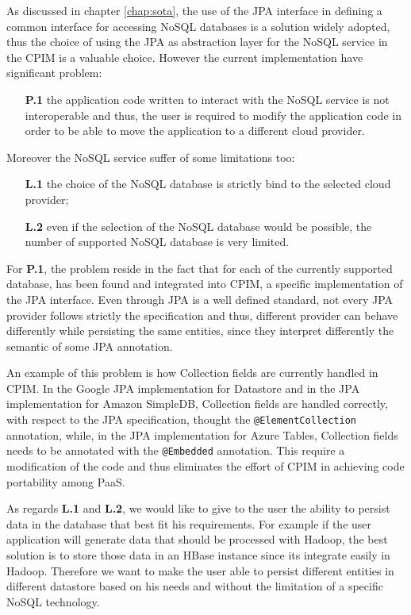 \newparagraph As discussed in chapter \ref{chap:sota}, the use of the JPA interface in defining a common interface for accessing NoSQL databases is a solution widely adopted, thus the choice of using the JPA as abstraction layer for the NoSQL service in the CPIM is a valuable choice. 
However the current implementation have significant problem:
\begin{enumerate}
\item[\textbf{P.1}] the application code written to interact with the NoSQL service is not interoperable and thus, the user is required to modify the application code in order to be able to move the application to a different cloud provider.  
\end{enumerate}
\noindent Moreover the NoSQL service suffer of some limitations too:
\begin{enumerate}
\item[\textbf{L.1}] the choice of the NoSQL database is strictly bind to the selected cloud provider; 
\item[\textbf{L.2}] even if the selection of the NoSQL database would be possible, the number of supported NoSQL database is very limited.
\end{enumerate}

\noindent For \textbf{P.1}, the problem reside in the fact that for each of the currently supported database, has been found and integrated into CPIM, a specific implementation of the JPA interface. Even through JPA is a well defined standard, not every JPA provider follows strictly the specification and thus, different provider can behave differently while persisting the same entities, since they interpret differently the semantic of some JPA annotation.

\noindent An example of this problem is how Collection fields are currently handled in CPIM. In the Google JPA implementation for Datastore and in the JPA implementation for Amazon SimpleDB, Collection fields are handled correctly, with respect to the JPA specification, thought the \texttt{@ElementCollection} annotation, while, in the JPA implementation for Azure Tables, Collection fields needs to be annotated with the \texttt{@Embedded} annotation. This require a modification of the code and thus eliminates the effort of CPIM in achieving code portability among PaaS.

\newparagraph As regards \textbf{L.1} and \textbf{L.2}, we would like to  give to the user the ability to persist data in the database that best fit his requirements. For example if the user application will generate data that should be processed with Hadoop, the best solution is to store those data in an HBase instance since its integrate easily in Hadoop. Therefore we want to make the user able to persist different entities in different datastore based on his needs and without the limitation of a specific NoSQL technology.

